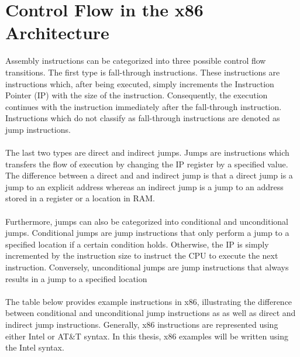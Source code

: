 \documentclass{kththesis}
\newcommand{\fbcomment}[1]{{#1}}
\renewcommand{\fbcomment}[1]{}
\begin{document}
\clearpage
\section{Control Flow in the x86 Architecture}\label{sec:controlFlowInX86}
\fbcomment{\color{red}Goal: Give the reader an understanding of what assembly instructions affect control flow and how}
Assembly instructions can be categorized into three possible control flow transitions\cite{CFGFromPowerPC}. The first type is fall-through instructions. These instructions are instructions which, after being executed, simply increments the Instruction Pointer (IP) with the size of the instruction. Consequently, the execution continues with the instruction immediately after the fall-through instruction. Instructions which do not classify as fall-through instructions are denoted as jump instructions. 
\\ \\
The last two types are direct and indirect jumps. Jumps are instructions which transfers the flow of execution by changing the IP register by a specified value. The difference between a direct and and indirect jump is that a direct jump is a jump to an explicit address whereas an indirect jump is a jump to an address stored in a register or a location in RAM. 
\\ \\
Furthermore, jumps can also be categorized into conditional and unconditional jumps. Conditional jumps are jump instructions that only perform a jump to a specified location if a certain condition holds. Otherwise, the IP is simply incremented by the instruction size to instruct the CPU to execute the next instruction. Conversely, unconditional jumps are jump instructions that always results in a jump to a specified location
\\ \\
The table below provides example instructions in x86, illustrating the difference between conditional and unconditional jump instructions as as well as direct and indirect jump instructions. Generally, x86 instructions are represented using either Intel or AT\&T syntax. In this thesis, x86 examples will be written using the Intel syntax.
\end{document}
